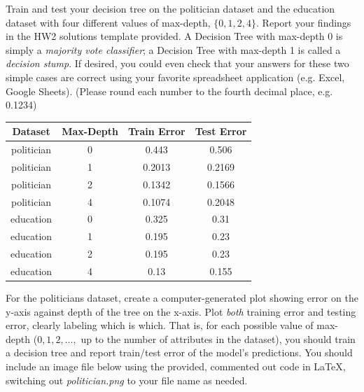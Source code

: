 \documentclass[11pt,addpoints,answers]{exam}
\begin{document}
 \begin{questions}
    \question[3] Train and test your decision tree on the politician dataset and the education dataset with four different values of max-depth, $\{0,1,2,4\}$. Report your findings in the HW2 solutions template provided. A Decision Tree with max-depth 0 is simply a \emph{majority vote classifier}; a Decision Tree with max-depth 1 is called a \emph{decision stump}. If desired, you could even check that your answers for these two simple cases are correct using your favorite spreadsheet application (e.g. Excel, Google Sheets). (Please round each number to the fourth decimal place, e.g. 0.1234)
    
    \begin{center}
    \begin{tabular}{cc|c|c}
        \toprule
        {\bf Dataset}   & {\bf Max-Depth} & {\bf Train Error} & {\bf Test Error} \\
        \midrule
        politician & 0 & 0.443  & 0.506  \\
        politician & 1 & 0.2013  & 0.2169  \\
        politician & 2 & 0.1342  & 0.1566  \\
        politician & 4 & 0.1074  & 0.2048  \\
        \midrule
        education & 0 & 0.325  & 0.31  \\
        education & 1 & 0.195  & 0.23  \\
        education & 2 & 0.195  & 0.23  \\
        education & 4 & 0.13  & 0.155  \\
        \bottomrule
    \end{tabular}
    \end{center}
    
    
    \clearpage
    
    \question[3] For the politicians dataset, create a computer-generated plot showing error on the y-axis against depth of the tree on the x-axis. Plot \emph{both} training error and testing error, clearly labeling which is which.  That is, for each possible value of max-depth ($0, 1, 2, \ldots,$ up to the number of attributes in the dataset), you should train a decision tree and report train/test error of the model's predictions. You should include an image file below using the provided, commented out code in LaTeX, switching out \textit{politician.png} to your file name as needed.
    

\end{questions}
\end{document}
